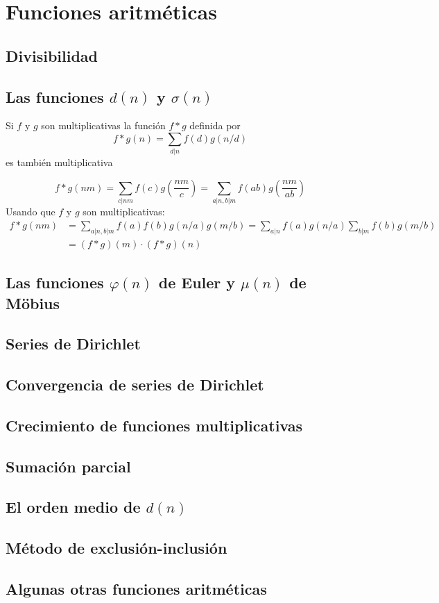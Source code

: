 \documentclass[TAN.tex]{subfiles}
\begin{document}
\chapter{Funciones aritméticas}
\section{Divisibilidad}

\section{Las funciones $d(n)$ y $σ(n)$}

\begin{prop} Si $f$ y $g$ son multiplicativas la función $f * g$ definida por
\[ f * g (n) = \sum_{d|n} f(d)g(n/d) \]
es también multiplicativa

\begin{dem}
\[ f*g(nm) = \sum_{c|nm}f(c)g\left(\frac{nm}{c}\right) = \sum_{a|n,b|m}f(ab)g\left(\frac{nm}{ab}\right) \]
Usando que $f$ y $g$ son multiplicativas:
\begin{align*}
	f*g(nm) & = \sum_{a|n,b|m} f(a)f(b)g(n/a)g(m/b)  = \sum_{a|n}f(a)g(n/a) \sum_{b|m}f(b)g(m/b) \\
	& = (f*g)(m) \cdot (f*g)(n)
\end{align*}
\end{dem}
\end{prop}

\section{Las funciones $φ(n)$ de Euler y $μ(n)$ de Möbius}

\section{Series de Dirichlet}

\section{Convergencia de series de Dirichlet}

\section{Crecimiento de funciones multiplicativas}

\section{Sumación parcial}

\section{El orden medio de $d(n)$}

\section{Método de exclusión-inclusión}

\section{Algunas otras funciones aritméticas}
\end{document}
